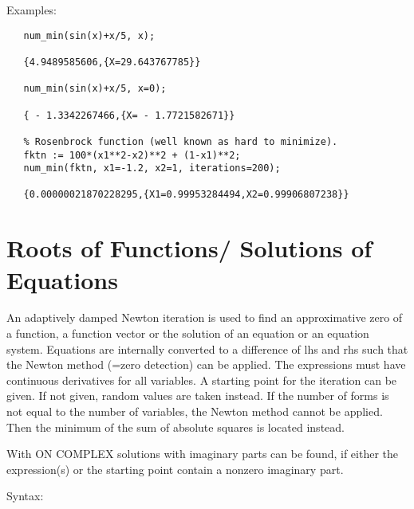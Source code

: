 Examples:

\begin{verbatim}
   num_min(sin(x)+x/5, x);

   {4.9489585606,{X=29.643767785}}
 
   num_min(sin(x)+x/5, x=0);

   { - 1.3342267466,{X= - 1.7721582671}}

   % Rosenbrock function (well known as hard to minimize).
   fktn := 100*(x1**2-x2)**2 + (1-x1)**2;
   num_min(fktn, x1=-1.2, x2=1, iterations=200);

   {0.00000021870228295,{X1=0.99953284494,X2=0.99906807238}}

\end{verbatim}
 
\section{Roots of Functions/ Solutions of Equations}
 
An adaptively damped Newton iteration is used to find
an approximative zero of a function, a function vector or the solution
of an equation or an equation system. Equations are
internally converted to a difference of lhs and rhs such
that the Newton method (=zero detection) can be applied. The expressions
must have continuous derivatives for all variables.
A starting point for the iteration can be given. If not given,
random values are taken instead. If the number of
forms is not equal to the number of variables, the
Newton method cannot be applied. Then the minimum
of the sum of absolute squares is located instead. 

With ON COMPLEX solutions with imaginary parts can be
found, if either the expression(s) or the starting point
contain a nonzero imaginary part. 

Syntax:

